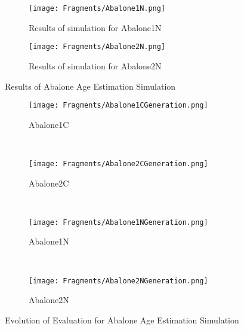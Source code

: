 \documentclass[a4paper,twoside]{article}
\begin{document}
\begin{enumerate}
\begin{figure}
  \begin{subfigure}[b]{0.4\textwidth}
    \begin{center}
      \texttt{[image: Fragments/Abalone1N.png]}
    \end{center}
    \caption{Results of simulation for Abalone1N}
    \label{fig:results.Abalone1N}
  \end{subfigure}  
\hfill
  \begin{subfigure}[b]{0.4\textwidth}
    \begin{center}
      \texttt{[image: Fragments/Abalone2N.png]}
    \end{center}
    \caption{Results of simulation for Abalone2N}
    \label{fig:results.Abalone2N}
  \end{subfigure}
  \caption{Results of Abalone Age Estimation Simulation}
\end{figure}

\begin{figure}
  \centering
  \begin{subfigure}[b]{0.2\textwidth}
    \begin{center}
      \texttt{[image: Fragments/Abalone1CGeneration.png]}
    \end{center}
    \caption{ Abalone1C}
    \label{fig:evaluation.Abalone1C}
  \end{subfigure}  
~
  \begin{subfigure}[b]{0.2\textwidth}
    \begin{center}
      \texttt{[image: Fragments/Abalone2CGeneration.png]}
    \end{center}
    \caption{ Abalone2C}
    \label{fig:evaluation.Abalone2C}
  \end{subfigure}
~
  \begin{subfigure}[b]{0.2\textwidth}
    \begin{center}
      \texttt{[image: Fragments/Abalone1NGeneration.png]}
    \end{center}
    \caption{ Abalone1N}
    \label{fig:evaluation.Abalone1N}
  \end{subfigure}  
~
  \begin{subfigure}[b]{0.2\textwidth}
    \begin{center}
      \texttt{[image: Fragments/Abalone2NGeneration.png]}
    \end{center}
    \caption{ Abalone2N}
    \label{fig:evaluation.Abalone2N}
  \end{subfigure}
  \label{fig evaluation abalone 1}
  \caption{Evolution of Evaluation for Abalone Age Estimation Simulation}
\end{figure}





\end{enumerate}
\end{document}
